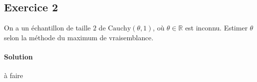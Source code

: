 \documentclass[../main.tex]{subfiles}
\begin{document}
\begin{CJK*}{UTF8}{gbsn}

\section*{Exercice 2}

On a un échantillon de taille $2$ de $\text{Cauchy}(\theta, 1)$, où $\theta \in \mathbb{R}$ est inconnu.
Estimer $\theta$ selon la méthode du maximum de vraisemblance. 

\paragraph{Solution}

à faire
\end{CJK*}
\end{document}
